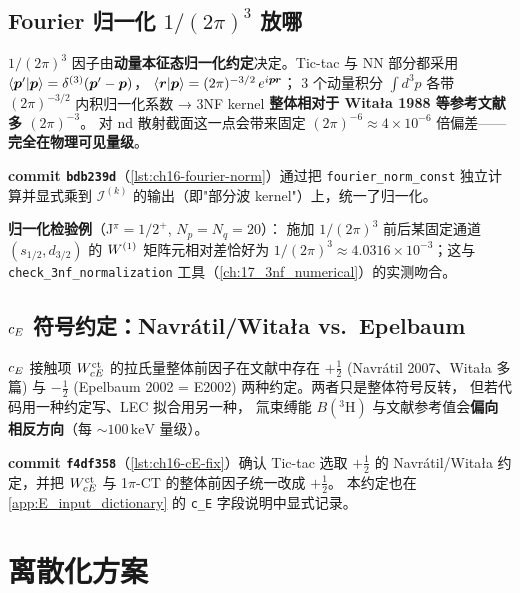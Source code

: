 \subsection{Fourier 归一化 \texorpdfstring{$1/(2\pi)^3$}{1/(2pi)^3} 放哪}
\label{subsec:ch16-fourier-norm}

\(1/(2\pi)^3\) 因子由\textbf{动量本征态归一化约定}决定。Tic-tac 与 NN 部分都采用
\(\langle \bm{p}'|\bm{p}\rangle = \delta^{(3)}(\bm{p}'-\bm{p})\)，
\(\langle \bm{r}|\bm{p}\rangle = (2\pi)^{-3/2}\,e^{i\bm{p}\!\cdot\!\bm{r}}\)；
3 个动量积分 \(\int d^3p\) 各带 \((2\pi)^{-3/2}\) 内积归一化系数 → 3NF kernel
\textbf{整体相对于 Witała 1988 等参考文献多 \((2\pi)^{-3}\)}。
对 nd 散射截面这一点会带来固定 \((2\pi)^{-6} \approx 4\times 10^{-6}\) 倍偏差——\textbf{完全在物理可见量级}。

\textbf{commit \texttt{bdb239d}}（\cref{lst:ch16-fourier-norm}）通过把 \texttt{fourier\_norm\_const}
独立计算并显式乘到 \(\mathcal{I}^{(k)}\) 的输出（即"部分波 kernel"）上，统一了归一化。

\begin{numericalbox}
\textbf{归一化检验例}（J\(^\pi=1/2^+\), \(N_p=N_q=20\)）：
施加 \(1/(2\pi)^3\) 前后某固定通道 \((s_{1/2}, d_{3/2})\) 的 \(W^{(1)}\) 矩阵元相对差恰好为
\(1/(2\pi)^3 \approx 4.0316 \times 10^{-3}\)；这与 \texttt{check\_3nf\_normalization}
工具（\cref{ch:17_3nf_numerical}）的实测吻合。
\end{numericalbox}

\subsection{\texorpdfstring{$c_E$}{c\_E} 符号约定：Navrátil/Witała vs.~Epelbaum}
\label{subsec:ch16-cE-sign}

\(c_E\) 接触项 \(W^{\rm ct}_{cE}\) 的拉氏量整体前因子在文献中存在 \(+\tfrac12\) (Navrátil 2007、Witała 多篇) 与
\(-\tfrac12\) (Epelbaum 2002 = E2002) 两种约定。两者只是整体符号反转，
但若代码用一种约定写、LEC 拟合用另一种，
氚束缚能 \(B(^3\!\mathrm{H})\) 与文献参考值会\textbf{偏向相反方向}（每 \(\sim\!100\,\mathrm{keV}\) 量级）。

\textbf{commit \texttt{f4df358}}（\cref{lst:ch16-cE-fix}）确认 Tic-tac 选取
\(+\tfrac12\) 的 Navrátil/Witała 约定，并把
\(W^{\rm ct}_{cE}\) 与 1\(\pi\)-CT 的整体前因子统一改成 \(+\tfrac12\)。
本约定也在 \cref{app:E_input_dictionary} 的 \texttt{c\_E} 字段说明中显式记录。

\section{离散化方案}
\label{sec:ch16-discretization}

